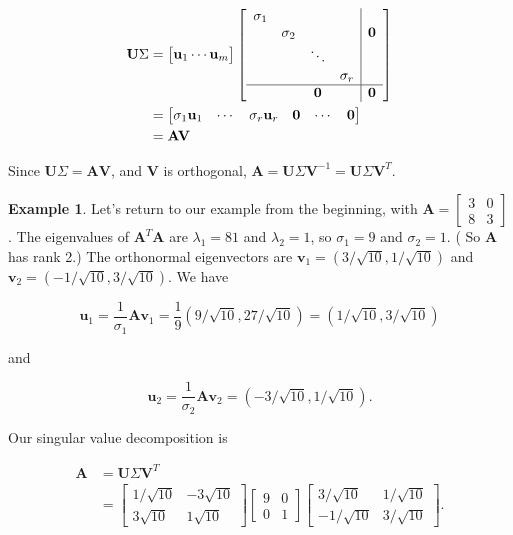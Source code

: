 \documentclass[
]{book}
\theoremstyle{definition}
\theoremstyle{definition}
\newtheorem{example}{Example}[chapter]
\theoremstyle{definition}
\theoremstyle{definition}
\theoremstyle{remark}
\begin{document}
\begin{align*}
\mathbf{U}\Sigma&=\begin{bmatrix}\mathbf{u}_1 \cdots \mathbf{u}_m\end{bmatrix} \left[\begin{array}{cccc|c}\sigma_1 &&& &\\& \sigma_2 &&&\mathbf{0}\\&&\ddots &&\\ & && \sigma_r & \\ \hline &&\mathbf{0}&&\mathbf{0}\end{array}\right]\\
&=\begin{bmatrix}\sigma_1\mathbf{u}_1 & \cdots & \sigma_r\mathbf{u}_r & \mathbf{0} & \cdots & \mathbf{0}\end{bmatrix}\\
&=\mathbf{A}\mathbf{V}
\end{align*}

Since \(\mathbf{U}\Sigma=\mathbf{A}\mathbf{V}\), and \(\mathbf{V}\) is orthogonal, \(\mathbf{A}=\mathbf{U}\Sigma \mathbf{V}^{-1}=\mathbf{U}\Sigma \mathbf{V}^T.\)

\begin{examplebox}

\begin{example}
Let's return to our example from the beginning, with \(\mathbf{A}=\begin{bmatrix}3 & 0\\8 & 3\end{bmatrix}\).
The eigenvalues of \(\mathbf{A}^T\mathbf{A}\) are \(\lambda_1=81\) and \(\lambda_2=1\), so \(\sigma_1=9\) and \(\sigma_2=1.\) ( So \(\mathbf{A}\) has rank 2.) The orthonormal eigenvectors are \(\mathbf{v}_1=(3/\sqrt{10},1/\sqrt{10})\) and \(\mathbf{v}_2=(-1/\sqrt{10},3/\sqrt{10})\). We have

\[\mathbf{u}_1=\frac{1}{\sigma_1}\mathbf{A}\mathbf{v}_1=\frac{1}{9}(9/\sqrt{10},27/\sqrt{10})=(1/\sqrt{10},3/\sqrt{10})\]

and

\[\mathbf{u}_2=\frac{1}{\sigma_2}\mathbf{A}\mathbf{v}_2=(-3/\sqrt{10},1/\sqrt{10}).\]

Our singular value decomposition is

\begin{align*}
\mathbf{A}&=\mathbf{U}\Sigma\mathbf{V}^T\\ 
&=\begin{bmatrix} 1/\sqrt{10} & -3\sqrt{10}\\ 3\sqrt{10} & 1\sqrt{10}\end{bmatrix}\begin{bmatrix}9 & 0\\0 & 1\end{bmatrix}\begin{bmatrix}3/\sqrt{10} & 1/\sqrt{10}\\-1/\sqrt{10} & 3/\sqrt{10}\end{bmatrix}.
\end{align*}
\end{example}

\end{examplebox}
\end{document}
